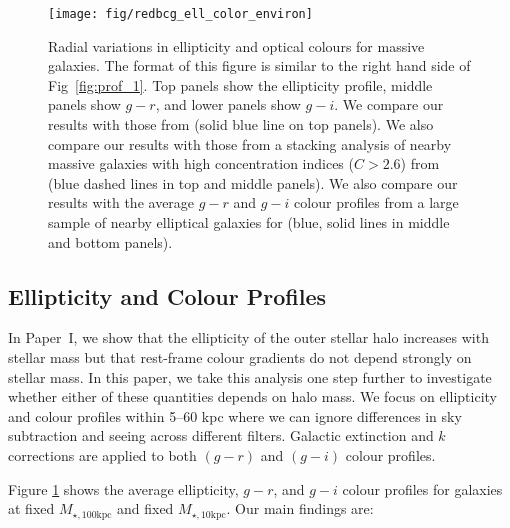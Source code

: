 \documentclass[a4paper,fleqn,usenatbib]{mnras}
\def\minn{{$M_{\star,10\mathrm{kpc}}$}}
\def\mtot{{$M_{\star,100\mathrm{kpc}}$}}
\begin{document}

  \begin{figure}
      \centering 
      \texttt{[image: fig/redbcg\_ell\_color\_environ]}
      \caption{
          Radial variations in ellipticity and optical colours for massive galaxies. 
          The format of this figure is similar to the right hand side of 
          Fig~\ref{fig:prof_1}. 
          Top panels show the ellipticity profile, middle panels show $g-r$, and lower 
          panels show $g-i$. 
          We compare our results with those from \citet{Tal2011}
          (solid blue line on top panels). 
          We also compare our results with those from a stacking analysis of nearby 
          massive galaxies with high concentration indices ($C>2.6$) from 
          \citet{DSouza2014} (blue dashed lines in top and middle panels). 
          We also compare our results with the average $g-r$ and $g-i$ colour profiles 
          from a large sample of nearby elliptical galaxies for \citet{LaBarbera2010}
          (blue, solid lines in middle and bottom panels).
          }
      \label{fig:ell_color}
  \end{figure}


\subsection{Ellipticity and Colour Profiles}
    \label{ssec:ell_color}
    
    In Paper~I, we show that the ellipticity of the outer stellar halo increases with stellar mass but that rest-frame colour gradients do not depend strongly on stellar mass. In this paper, we take this analysis one step further to investigate whether either 
    of these quantities depends on halo mass. 
    We focus on ellipticity and colour profiles within 5--60 kpc where we can ignore
    differences in sky subtraction and seeing across different filters. 
    Galactic extinction and $k$ corrections are applied to both $(g-r)$ and $(g-i)$ 
    colour profiles.
    
    Figure \ref{fig:ell_color} shows the average ellipticity, $g-r$, and $g-i$ colour 
    profiles for galaxies at fixed \mtot{} and fixed \minn{}. Our main findings are: 
    
\end{document}
